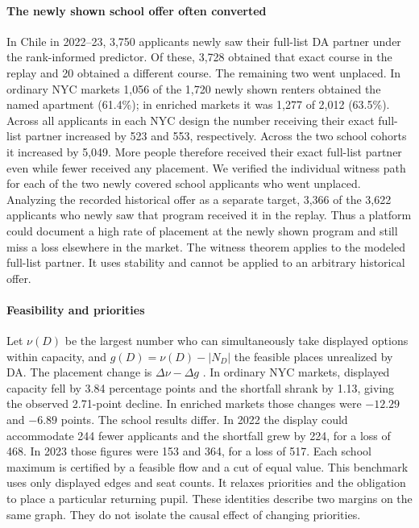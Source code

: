 \paragraph{The newly shown school offer often converted}
In Chile in 2022--23, 3,750 applicants newly saw their full-list DA partner under the rank-informed predictor. Of these, 3,728 obtained that exact course in the replay and 20 obtained a different course. The remaining two went unplaced. In ordinary NYC markets 1,056 of the 1,720 newly shown renters obtained the named apartment (61.4\%); in enriched markets it was 1,277 of 2,012 (63.5\%). Across all applicants in each NYC design the number receiving their exact full-list partner increased by 523 and 553, respectively. Across the two school cohorts it increased by 5,049. More people therefore received their exact full-list partner even while fewer received any placement. We verified the individual witness path for each of the two newly covered school applicants who went unplaced. Analyzing the recorded historical offer as a separate target, 3,366 of the 3,622 applicants who newly saw that program received it in the replay. Thus a platform could document a high rate of placement at the newly shown program and still miss a loss elsewhere in the market. The witness theorem applies to the modeled full-list partner. It uses stability and cannot be applied to an arbitrary historical offer.

\paragraph{Feasibility and priorities}
Let $\nu(D)$ be the largest number who can simultaneously take displayed options within capacity, and $g(D)=\nu(D)-|N_D|$ the feasible places unrealized by DA. The placement change is $\Delta\nu-\Delta g$ \citep{aguiarhong2026}. In ordinary NYC markets, displayed capacity fell by 3.84 percentage points and the shortfall shrank by 1.13, giving the observed 2.71-point decline. In enriched markets those changes were $-12.29$ and $-6.89$ points. The school results differ. In 2022 the display could accommodate 244 fewer applicants and the shortfall grew by 224, for a loss of 468. In 2023 those figures were 153 and 364, for a loss of 517. Each school maximum is certified by a feasible flow and a cut of equal value. This benchmark uses only displayed edges and seat counts. It relaxes priorities and the obligation to place a particular returning pupil. These identities describe two margins on the same graph. They do not isolate the causal effect of changing priorities.
